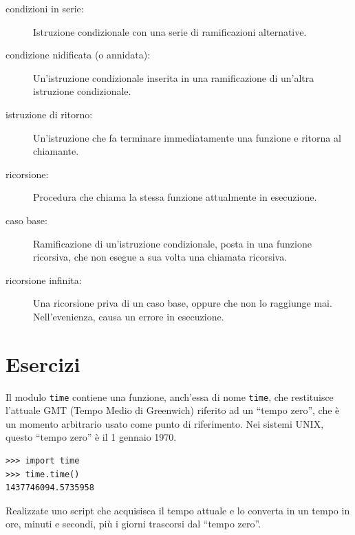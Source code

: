 \documentclass[10pt]{book}
\begin{document}
\begin{description}
\item[condizioni in serie:]  Istruzione condizionale con una serie di ramificazioni alternative.

\item[condizione nidificata (o annidata):]  Un'istruzione condizionale inserita in una ramificazione di un'altra istruzione condizionale.

\item[istruzione di ritorno:] Un'istruzione che fa terminare immediatamente una funzione e ritorna al chiamante.

\item[ricorsione:]  Procedura che chiama la stessa funzione attualmente in esecuzione.

\item[caso base:]  Ramificazione di un'istruzione condizionale, posta in una funzione ricorsiva, che non esegue a sua volta una chiamata ricorsiva.

\item[ricorsione infinita:]  Una ricorsione priva di un caso base, oppure che non lo raggiunge mai. Nell'evenienza, causa un errore in esecuzione.

\end{description}

\section{Esercizi}

\begin{exercise}

Il modulo {\tt time} contiene una funzione, anch'essa di nome {\tt time}, che restituisce l'attuale GMT (Tempo Medio di Greenwich) riferito ad un ``tempo zero'', che è un momento arbitrario usato come punto di riferimento. Nei sistemi UNIX, questo ``tempo zero'' è il 1 gennaio 1970.

\begin{verbatim}
>>> import time
>>> time.time()
1437746094.5735958
\end{verbatim}

Realizzate uno script che acquisisca il tempo attuale e lo converta in un tempo in ore, minuti e secondi, più i giorni trascorsi dal ``tempo zero''.

\end{exercise}
\end{document}
